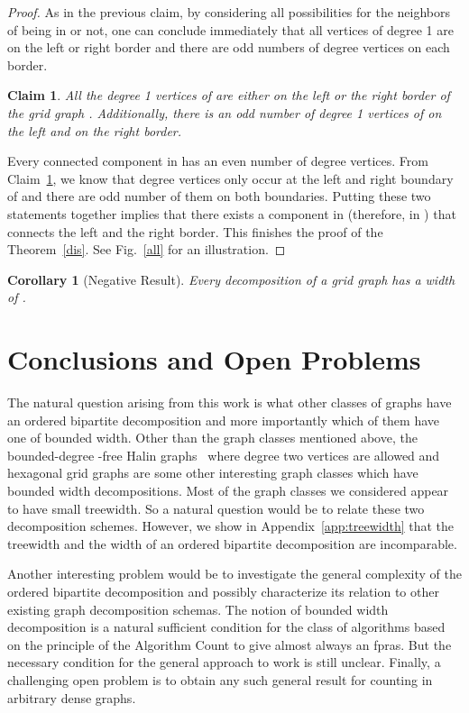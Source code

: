 \documentclass[11pt]{article}
\newtheorem{claim}[theorem]{Claim}
\newtheorem{corollary}[theorem]{Corollary}
\newcommand{\FI}[1]{Fig.\ \ref{#1}}
\begin{document}
\begin{proof}
As in the previous claim, by considering all possibilities for the neighbors of  being in  or not, one can conclude immediately that all vertices of degree 1 are on the left or right border and there are odd numbers of degree  vertices on each border. 
\begin{claim} \label{cl2}
All the degree 1 vertices of  are either on the left or the right border of the grid graph . Additionally, there is an odd number of degree 1 vertices of  on the left and on the right border. 
\end{claim}

Every connected component in  has an even number of degree  vertices. From Claim~\ref{cl2}, we know that degree  vertices only occur at the left and right boundary of  and there are odd number of them on both boundaries. Putting these two statements together implies that there exists a component in  (therefore, in ) that connects the left and the right border. This finishes the proof of the Theorem~\ref{dis}. See \FI{all} for an illustration.
\end{proof}



\begin{corollary} [Negative Result]
Every decomposition of a  grid graph  has a width of  .
\end{corollary}


\section{Conclusions and Open Problems} \label{sec:concl}
The natural question arising from this work is what other classes of graphs have an ordered bipartite decomposition and more importantly which of them have one of bounded width. Other than the graph classes mentioned above, the bounded-degree -free Halin graphs~\cite{hali} where degree two vertices are allowed and hexagonal grid graphs are some other interesting graph classes which have bounded width decompositions.  Most of the graph classes we considered appear to have small treewidth. So a natural question would be to relate these two decomposition schemes. However, we show in Appendix~\ref{app:treewidth} that the treewidth and the width of an ordered bipartite decomposition are incomparable.

Another interesting problem would be to investigate the general complexity of the ordered bipartite decomposition and possibly characterize its relation to other existing graph decomposition schemas. The notion of bounded width decomposition is a natural sufficient condition for the class of algorithms based on the principle of the Algorithm Count to give almost always an fpras. But the necessary condition for the general approach to work is still unclear.  Finally, a challenging open problem is to obtain any such general result for counting in arbitrary dense graphs. 
\end{document}
